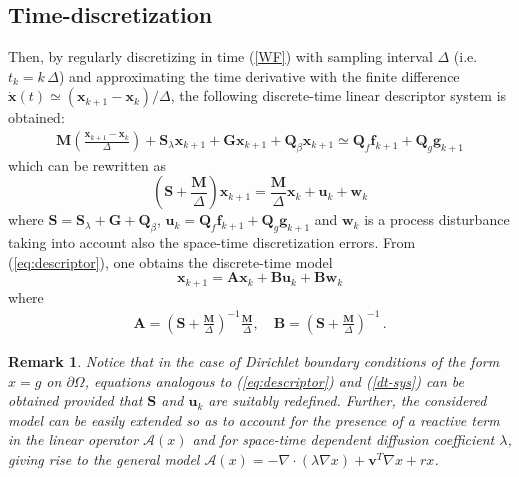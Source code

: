 \documentclass[journal]{IEEEtran}
\newcommand{\mb}{\mathbf}
\newcommand{\be}{\begin{equation}}
\newcommand{\ee}{\end{equation}}
\newtheorem{remark}{Remark}
\begin{document}
\subsection{Time-discretization}
Then, by regularly discretizing in time (\ref{WF}) with sampling interval $\Delta $ (i.e. $t_k = k \, \Delta$) and approximating the time
	derivative with the finite difference  $\dot{\mb{x}}(t)\simeq
	(\mb{x}_{k+1}-\mb{x}_k)/\Delta$, the following discrete-time linear descriptor system is
	obtained:
	\begin{multline}
	\mb{M}\left(\frac{\mb{x}_{k+1}-\mb{x}_k}{\Delta}\right) +
	\mb{S}_\lambda \mb{x}_{k+1}  + \mb{G}\mb{x}_{k+1} + \mb{Q}_\beta\mb{x}_{k+1} \simeq
	 \mb{Q}_{f} {\mb{f}}_{k+1}+ \mb{Q}_{g} {\mb{g}}_{k+1}
	\label{dt-desc-sys}
	\end{multline}
	which can be rewritten as
	\begin{equation}\label{eq:descriptor}
	\left ( \mb{S} + \frac{\mb{M}}{\Delta} \right ) \mb{x}_{k+1} = \frac{\mb{M}}{\Delta}  \mb{x}_{k} + \mb{u}_k + \mb{w}_k
	\end{equation}
	where $\mb{S} = \mb{S}_\lambda + \mb{G} + \mb{Q}_\beta $, $\mb{u}_k =  \mb{Q}_{f} {\mb{f}}_{k+1}+ \mb{Q}_{g} {\mb{g}}_{k+1}$ and
	$\mb{w}_k$ is a process disturbance taking into account also the space-time discretization errors. 
	From (\ref{eq:descriptor}), one obtains the discrete-time model
	\be 
	\mb{x}_{k+1} = \mb{A}\mb{x}_k + \mb{B}   \mb{u}_{k} + \mb{B}   \mb{w}_k 
	\label{dt-sys}
	\ee
	where
	\[
	\begin{aligned}\label{eq:A}
	\mb{A} =  \left ( \mb{S} + \frac{\mb{M}}{\Delta} \right )^{-1} \frac{\mb{M}}{\Delta}  , \quad \mb{B} = \left ( \mb{S} + \frac{\mb{M}}{\Delta} \right )^{-1} \, .
	\end{aligned}
	\]
	
	\begin{remark}
	Notice that in the case of Dirichlet boundary conditions of the form $x =g$ on $\partial \Omega$, equations analogous to (\ref{eq:descriptor})
	and (\ref{dt-sys}) can be obtained provided that $\mb{S}$ and $\mb{u}_k$ are suitably redefined. Further, the considered model can be easily extended 
	so as to account for the presence of a reactive term in the linear operator $\mathcal A (x)$ and for space-time dependent diffusion coefficient $\lambda$,
	giving rise to the general model $\mathcal{A}(x) = - \nabla \cdot (\lambda \nabla x) + \mb{v}^T \nabla x + r x$.
	\end{remark}
	
\end{document}
